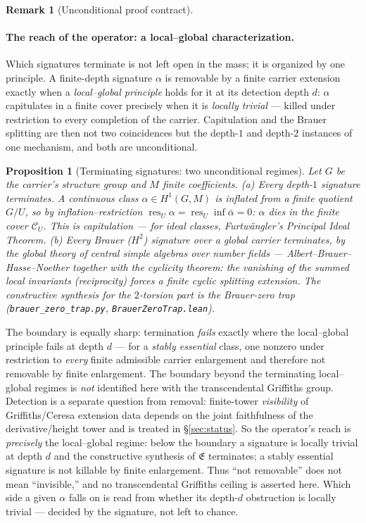 \documentclass[11pt]{article}
\newtheorem{proposition}[theorem]{Proposition}
\theoremstyle{definition}
\newtheorem{remark}[theorem]{Remark}
\begin{document}
\begin{remark}[Unconditional proof contract]
\begin{enumerate}
\paragraph{The reach of the operator: a local--global characterization.} Which signatures terminate is not
left open in the mass; it is organized by one principle. A finite-depth signature $\alpha$ is removable by a
finite carrier extension exactly when a \emph{local--global principle} holds for it at its detection depth $d$:
$\alpha$ capitulates in a finite cover precisely when it is \emph{locally trivial} --- killed under restriction to
every completion of the carrier. Capitulation and the Brauer splitting are then not two coincidences but the
depth-$1$ and depth-$2$ instances of one mechanism, and both are unconditional.
\begin{proposition}[Terminating signatures: two unconditional regimes]\label{prop:terminating}
Let $G$ be the carrier's structure group and $M$ finite coefficients.
\textup{(a)} \emph{Every} depth-$1$ signature terminates. A continuous class $\alpha\in H^1(G,M)$ is inflated from
a finite quotient $G/U$, so by inflation--restriction $\operatorname{res}_U\alpha=\operatorname{res}_U
\operatorname{inf}\bar\alpha=0$: $\alpha$ dies in the finite cover $\mathcal C_U$. This is capitulation --- for
ideal classes, Furtw\"angler's Principal Ideal Theorem.
\textup{(b)} \emph{Every} Brauer ($H^2$) signature over a global carrier terminates, by the global theory of
central simple algebras over number fields --- Albert--Brauer--Hasse--Noether together with the cyclicity
theorem: the vanishing of the summed local invariants (reciprocity) forces a finite cyclic splitting extension. The constructive synthesis for the $2$-torsion part is the Brauer-zero trap
(\texttt{brauer\_zero\_trap.py}, \texttt{BrauerZeroTrap.lean}).
\end{proposition}
\noindent The boundary is equally sharp: termination \emph{fails} exactly where the local--global principle fails
at depth $d$ --- for a \emph{stably essential} class, one nonzero under restriction to \emph{every} finite
admissible carrier enlargement and therefore not removable by finite enlargement. The boundary beyond the
terminating local--global regimes is \emph{not} identified here with the transcendental Griffiths group.
Detection is a separate question from removal: finite-tower \emph{visibility} of Griffiths/Ceresa extension data
depends on the joint faithfulness of the derivative/height tower and is treated in \S\ref{sec:status}. So the
operator's reach is \emph{precisely} the local--global regime: below the boundary a signature is locally trivial
at depth $d$ and the constructive synthesis of $\mathfrak E$ terminates; a stably essential signature is not
killable by finite enlargement. Thus ``not removable'' does not mean ``invisible,'' and no transcendental
Griffiths ceiling is asserted here. Which side a given $\alpha$ falls on is read from whether its depth-$d$
obstruction is locally trivial --- decided by the signature, not left to chance.


\end{enumerate}
\end{remark}
\end{document}
